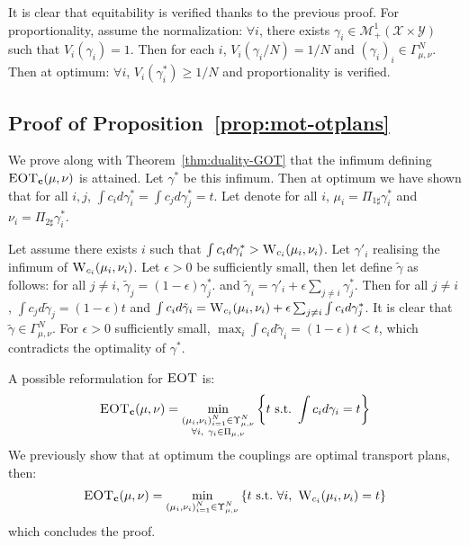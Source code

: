 \begin{prv*}
It is clear that equitability is verified thanks to the previous proof. For proportionality, assume the normalization:  $\forall i$, there exists $\gamma_i\in\mathcal{M}_+^1(\mathcal{X}\times\mathcal{Y})$ such that $V_i(\gamma_i)=1$. Then for each $i$, $V_i(\gamma_i/N)=1/N$ and $(\gamma_i)_i\in\Gamma^N_{\mu,\nu}$. Then at optimum: $\forall i$, $V_i(\gamma_i^*)\geq 1/N$ and proportionality is verified.


\end{prv*}

\subsection{Proof of Proposition~\ref{prop:mot-otplans}}
\label{prv:mot-otplans}

\begin{prv*}

 
We prove along with Theorem~\ref{thm:duality-GOT} that the infimum defining $\textsc{EOT}_\mathbf{c}(\mu,\nu)$ is attained. Let $\gamma^*$ be this infimum. Then at optimum we have shown that for all $i,j$, $\int c_id\gamma^*_i=\int c_jd\gamma^*_j = t$. Let denote for all $i$, $\mu_i=\Pi_{1\sharp}\gamma^*_i$ and $\nu_i=\Pi_{2\sharp}\gamma^*_i$. 

Let assume there exists $i$ such that $\int c_i d\gamma^*_i>\textsc{W}_{c_i}(\mu_i,\nu_i)$. Let $\gamma'_i$ realising the infimum of $\textsc{W}_{c_i}(\mu_i,\nu_i)$. Let $\epsilon>0$ be sufficiently small, then let define $\tilde{\gamma}$ as follows: for all $j\neq i$, $\tilde{\gamma}_j=(1-\epsilon)\gamma^*_j$. and $\tilde{\gamma}_i = \gamma'_i+\epsilon \sum_{j\neq i}\gamma^*_j$.
Then for all $j\neq i$, $\int c_j d \tilde{\gamma}_j = (1-\epsilon) t$ and $\int c_i d \tilde{\gamma}_i = \textsc{W}_{c_i}(\mu_i,\nu_i)+\epsilon \sum_{j\neq i} \int c_id\gamma^*_j$. It is clear that $\tilde{\gamma}\in \Gamma^N_{\mu,\nu}$. For $\epsilon>0$ sufficiently small, $\max_i\int c_id\tilde{\gamma}_i = (1-\epsilon) t<t$, which contradicts the optimality of $\gamma^*$.

A possible reformulation for $\textsc{EOT}$ is:
\begin{align*}
\textsc{EOT}_\mathbf{c}(\mu,\nu) = \min_{\substack{(\mu_i,\nu_i)_{i=1}^N\in\Upsilon^N_{\mu,\nu}\\ \forall i,~\gamma_i\in\Pi_{\mu,\nu}}}\left\{t~\mathrm{s.t.}~\int c_id\gamma_i=t\right\}
\end{align*}
We previously show that at optimum the couplings are optimal transport plans, then:
\begin{align*}
\textsc{EOT}_\mathbf{c}(\mu,\nu) =\min_{\substack{(\mu_i,\nu_i)_{i=1}^N\in\Upsilon^N_{\mu,\nu}}} \left\{t~\mathrm{s.t.}~ \forall i,~ \textsc{W}_{c_i}(\mu_i,\nu_i) =t\right\}
\end{align*}
which concludes the proof.
\end{prv*}


